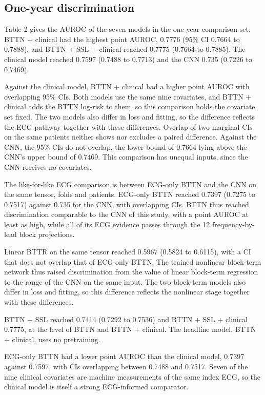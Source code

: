 \documentclass[preprint,12pt]{elsarticle}
\begin{document}
\subsection{One-year discrimination}

Table 2 gives the AUROC of the seven models in the one-year comparison set. BTTN + clinical had the highest point AUROC, 0.7776 (95\% CI 0.7664 to 0.7888), and BTTN + SSL + clinical reached 0.7775 (0.7664 to 0.7885). The clinical model reached 0.7597 (0.7488 to 0.7713) and the CNN 0.735 (0.7226 to 0.7469).

Against the clinical model, BTTN + clinical had a higher point AUROC with overlapping 95\% CIs. Both models use the same nine covariates, and BTTN + clinical adds the BTTN log-risk to them, so this comparison holds the covariate set fixed. The two models also differ in loss and fitting, so the difference reflects the ECG pathway together with these differences. Overlap of two marginal CIs on the same patients neither shows nor excludes a paired difference. Against the CNN, the 95\% CIs do not overlap, the lower bound of 0.7664 lying above the CNN's upper bound of 0.7469. This comparison has unequal inputs, since the CNN receives no covariates.

The like-for-like ECG comparison is between ECG-only BTTN and the CNN on the same tensor, folds and patients. ECG-only BTTN reached 0.7397 (0.7275 to 0.7517) against 0.735 for the CNN, with overlapping CIs. BTTN thus reached discrimination comparable to the CNN of this study, with a point AUROC at least as high, while all of its ECG evidence passes through the 12 frequency-by-lead block projections.

Linear BTTR on the same tensor reached 0.5967 (0.5824 to 0.6115), with a CI that does not overlap that of ECG-only BTTN. The trained nonlinear block-term network thus raised discrimination from the value of linear block-term regression to the range of the CNN on the same input. The two block-term models also differ in loss and fitting, so this difference reflects the nonlinear stage together with these differences.

BTTN + SSL reached 0.7414 (0.7292 to 0.7536) and BTTN + SSL + clinical 0.7775, at the level of BTTN and BTTN + clinical. The headline model, BTTN + clinical, uses no pretraining.

ECG-only BTTN had a lower point AUROC than the clinical model, 0.7397 against 0.7597, with CIs overlapping between 0.7488 and 0.7517. Seven of the nine clinical covariates are machine measurements of the same index ECG, so the clinical model is itself a strong ECG-informed comparator.
\end{document}
